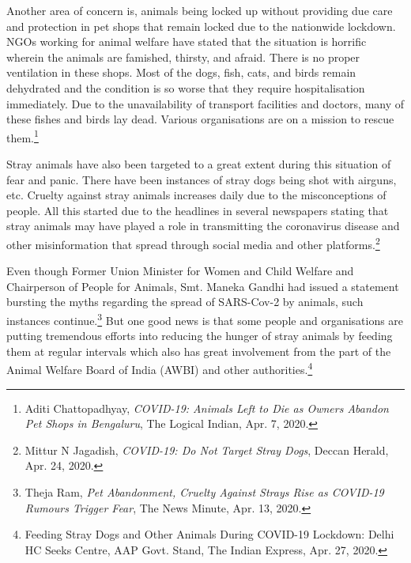 \begin{multicols}{2}
\vspace{-.15cm}

\noi
Another area of concern is, animals being locked up without providing due care and
protection in pet shops that remain locked due to the nationwide lockdown. NGOs working
for animal welfare have stated that the situation is horrific wherein the animals are famished,
thirsty, and afraid. There is no proper ventilation in these shops. Most of the dogs, fish, cats,
and birds remain dehydrated and the condition is so worse that they require hospitalisation
immediately. Due to the unavailability of transport facilities and doctors, many of these fishes
and birds lay dead. Various organisations are on a mission to rescue them.\footnote{Aditi Chattopadhyay, \textit{COVID-19: Animals Left to Die as Owners Abandon Pet Shops in Bengaluru}, The Logical Indian, Apr. 7, 2020.}

\vspace{-.15cm}

\noi
Stray animals have also been targeted to a great extent during this situation of fear and panic.
There have been instances of stray dogs being shot with airguns, etc. Cruelty against stray
animals increases daily due to the misconceptions of people. All this started due to the
headlines in several newspapers stating that stray animals may have played a role in
transmitting the coronavirus disease and other misinformation that spread through social
media and other platforms.\footnote{Mittur N Jagadish, \textit{COVID-19: Do Not Target Stray Dogs}, Deccan Herald, Apr. 24, 2020.}

\vspace{-.15cm}

\noi
Even though Former Union Minister for Women and Child Welfare and Chairperson of
People for Animals, Smt. Maneka Gandhi had issued a statement bursting the myths
regarding the spread of SARS-Cov-2 by animals, such instances continue.\footnote{Theja Ram, \textit{Pet Abandonment, Cruelty Against Strays Rise as COVID-19 Rumours Trigger Fear}, The News Minute, Apr. 13, 2020. } But one good
news is that some people and organisations are putting tremendous efforts into reducing the hunger of stray animals by feeding them at regular intervals which also has great involvement
from the part of the Animal Welfare Board of India (AWBI) and other authorities.\footnote{Feeding Stray Dogs and Other Animals During COVID-19 Lockdown: Delhi HC Seeks Centre, AAP Govt. Stand, The Indian Express, Apr. 27, 2020.}

\vspace{-.15cm}



\end{multicols}
